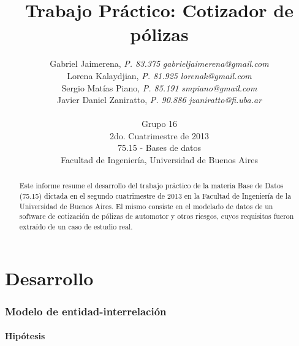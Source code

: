 \documentclass[a4paper,11pt]{article}
\title{\textbf{Trabajo Práctico: Cotizador de pólizas}}
\author{
  Gabriel Jaimerena,      \textit{P. 83.375}	\textit{gabrieljaimerena@gmail.com}	            \\
  Lorena Kalaydjian,     \textit{P. 81.925}		\textit{lorenak@gmail.com}                		\\
  Sergio Matías Piano,     \textit{P. 85.191}	\textit{smpiano@gmail.com}                  	\\
  Javier Daniel Zaniratto, \textit{P. 90.886}	\textit{jzaniratto@fi.uba.ar}                   \\
  \\
  \normalsize{Grupo 16}                        			  			\\
  \normalsize{2do. Cuatrimestre de 2013}                           	\\
  \normalsize{75.15 - Bases de datos}                              	\\
  \normalsize{Facultad de Ingeniería, Universidad de Buenos Aires}
}
\date{}
\begin{document}
\thispagestyle{empty}
\maketitle

\begin{abstract}

  Este informe resume el desarrollo del trabajo práctico de la materia Base
  de Datos (75.15) dictada en el segundo cuatrimestre de 2013 en la Facultad de
  Ingeniería de la Universidad de Buenos Aires. El mismo consiste en el
  modelado de datos de un software de cotización de pólizas de automotor y otros riesgos,
  cuyos requisitos fueron extraído de un caso de estudio real.

\end{abstract}

\clearpage

\tableofcontents
\clearpage


\part{Desarrollo}


\section{Modelo de entidad-interrelación} \label{sec:der}

\subsection{Hipótesis}
\end{document}
